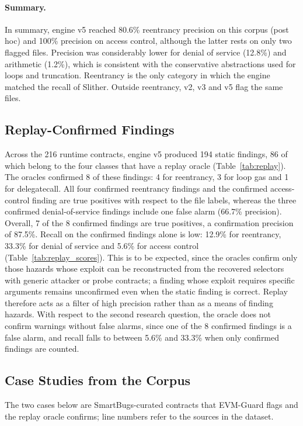 \documentclass[pdflatex,sn-mathphys]{sn-jnl}
\theoremstyle{thmstyletwo}
\theoremstyle{thmstyletwo}
\begin{document}
\paragraph{Summary.} In summary, engine v5 reached 80.6\% reentrancy precision on this corpus (post hoc) and 100\% precision on access control, although the latter rests on only two flagged files. Precision was considerably lower for denial of service (12.8\%) and arithmetic (1.2\%), which is consistent with the conservative abstractions used for loops and truncation. Reentrancy is the only category in which the engine matched the recall of Slither. Outside reentrancy, v2, v3 and v5 flag the same files.

\subsection{Replay-Confirmed Findings}\label{sec:results:replay}
Across the 216 runtime contracts, engine v5 produced 194 static findings, 86 of which belong to the four classes that have a replay oracle (Table~\ref{tab:replay}). The oracles confirmed 8 of these findings: 4 for reentrancy, 3 for loop gas and 1 for delegatecall. All four confirmed reentrancy findings and the confirmed access-control finding are true positives with respect to the file labels, whereas the three confirmed denial-of-service findings include one false alarm (66.7\% precision). Overall, 7 of the 8 confirmed findings are true positives, a confirmation precision of 87.5\%. Recall on the confirmed findings alone is low: 12.9\% for reentrancy, 33.3\% for denial of service and 5.6\% for access control (Table~\ref{tab:replay_scores}). This is to be expected, since the oracles confirm only those hazards whose exploit can be reconstructed from the recovered selectors with generic attacker or probe contracts; a finding whose exploit requires specific arguments remains unconfirmed even when the static finding is correct. Replay therefore acts as a filter of high precision rather than as a means of finding hazards. With respect to the second research question, the oracle does not confirm warnings without false alarms, since one of the 8 confirmed findings is a false alarm, and recall falls to between 5.6\% and 33.3\% when only confirmed findings are counted.

\subsection{Case Studies from the Corpus}\label{sec:case_studies}
The two cases below are SmartBugs-curated contracts that EVM-Guard flags and the replay oracle confirms; line numbers refer to the sources in the dataset.
\end{document}

